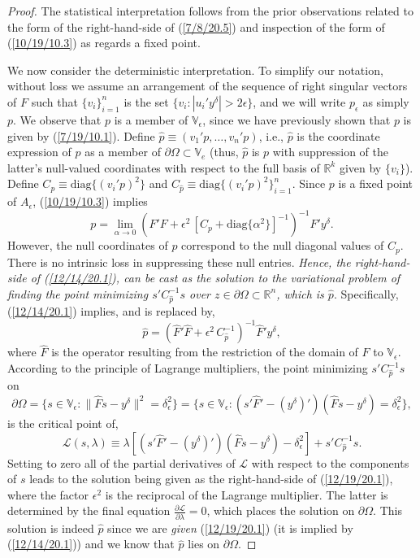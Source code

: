 \documentclass{amsart}
\numberwithin{equation}{section}
\theoremstyle{definition}
\numberwithin{theorem}{section}
\begin{document}
\begin{proof}
The statistical interpretation follows from the prior observations related to the form of the right-hand-side of (\ref{7/8/20.5}) and inspection of the form of (\ref{10/19/10.3}) as regards a fixed point.

We now consider the deterministic interpretation.   
To simplify our notation, without loss we assume an arrangement of the sequence of right singular vectors of $F$ such that $\{v_i\}_{i=1}^n$ is the set $\{v_i: |u_i'y^\delta| > 2\epsilon \}$, and we will write $p_\epsilon$ as simply $p$.  We observe that $p$ is a member of $\mathbb{V}_\epsilon$, since we have previously shown that $p$ is given by (\ref{7/19/10.1}). 
Define $\hat{p} \equiv (v_1'p,\dots,v_n'p)$, i.e., $\hat{p}$ is the coordinate expression of $p$ as a member of $\partial\Omega\subset \mathbb{V}_e$ (thus, $\hat{p}$ is $p$ with suppression of the latter's null-valued coordinates with respect to the full basis of $\mathbb{R}^k$ given by $\{v_i\}$). 
Define $C_p \equiv \mbox{diag}\{(v_i'p)^2\}$ and  $C_{\hat{p}} \equiv  \mbox{diag}\{(v_i'p)^2\}_{i=1}^n$.  Since $p$ is a fixed point of $A_\epsilon$,  (\ref{10/19/10.3}) implies \begin{equation} p = \lim_{\alpha\rightarrow 0} \left(F'F+\epsilon^2\,\left[C_p + \mbox{diag}\{\alpha^2\}\right]^{-1}\right)^{-1} F'y^\delta.\label{12/14/20.1}\end{equation} However, the null coordinates of $p$ correspond to the null diagonal values of $C_p$.  There is no intrinsic loss in suppressing these null entries.  {\it Hence, the right-hand-side of (\ref{12/14/20.1}), can be cast as the solution to the variational problem of finding the point minimizing $s'C^{-1}_{\hat{p}} s$ over $z\in \partial\Omega \subset \mathbb{R}^n$, which is $\hat{p}$}.
Specifically, (\ref{12/14/20.1}) implies, and is replaced by, 
\begin{equation} \hat{p} = \left(\hat{F}'\hat{F}+\epsilon^2\,C_{\hat{p}}^{-1}\right)^{-1} \hat{F}'y^\delta, \label{12/19/20.1}\end{equation} where $\hat{F}$ is the operator resulting from the restriction of the domain of $F$ to $\mathbb{V}_\epsilon$.
  According to the principle of Lagrange multipliers, the point minimizing $s'C^{-1}_{\hat{p}} s$ on \[ \partial\Omega = \{s\in \mathbb{V}_\epsilon: \| \hat{F} s -y^\delta\|^2 = \delta_\epsilon^2\} = \{s\in \mathbb{V}_\epsilon: (s'\hat{F}' - (y^{\delta})')(\hat{F} s - y^\delta) = \delta_\epsilon^2\},\] is the critical point of, \[ \mathcal{L}(s,\lambda) \equiv \lambda\left[ (s'\hat{F}' - (y^{\delta})')(\hat{F} s - y^\delta) -\delta_\epsilon^2\right] + s'C^{-1}_{\hat{p}} s.\] 
Setting to zero all of the partial derivatives of $\mathcal{L}$ with respect to the components of $s$ leads to the solution being given as the right-hand-side of (\ref{12/19/20.1}), where the factor $\epsilon^2$ is the reciprocal of the Lagrange multiplier.  The latter is determined by the final equation $\frac{\partial \mathcal{L}}{\partial \lambda} = 0$, which places the solution on $\partial\Omega$.  This solution is indeed $\hat{p}$ since we are {\it given} (\ref{12/19/20.1}) (it is implied by (\ref{12/14/20.1})) and we know that $\hat{p}$ lies on $\partial\Omega$. 


\end{proof}
\end{document}
